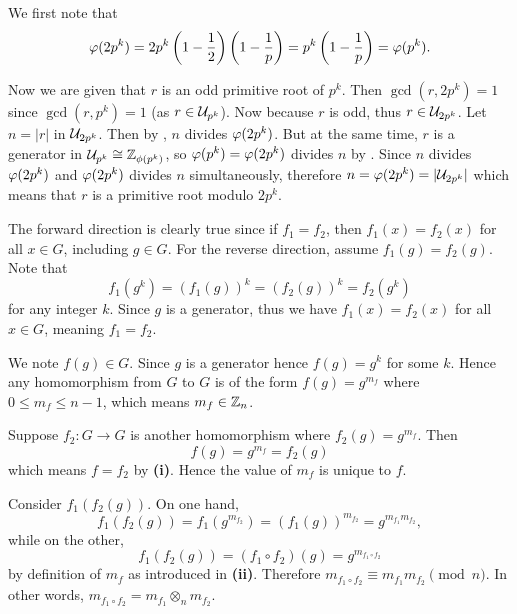 \begin{questions}
    \item We first note that
    \[
        \varphi(2p^k) = 2p^k\left(1-\frac12\right)\left(1-\frac1p\right) = p^k\left(1-\frac1p\right) = \varphi(p^k).
    \]

    Now we are given that $r$ is an odd primitive root of $p^k$. Then $\gcd(r, 2p^k) = 1$ since $\gcd(r, p^k) = 1$ (as $r \in \mathcal{U}_{p^k}$). Now because $r$ is odd, thus $r \in \mathcal{U}_{2p^k}$. Let $n = |r|$ in $\mathcal{U}_{2p^k}$. Then by , $n$ divides $\varphi(2p^k)$. But at the same time, $r$ is a generator in $\mathcal{U}_{p^k} \cong \mathbb{Z}_{\phi(p^k)}$, so $\varphi(p^k) = \varphi(2p^k)$ divides $n$ by . Since $n$ divides $\varphi(2p^k)$ and $\varphi(2p^k)$ divides $n$ simultaneously, therefore $n = \varphi(2p^k) = |\mathcal{U}_{2p^k}|$ which means that $r$ is a primitive root modulo $2p^k$.

    \item \begin{partquestions}{\roman*}
        \item The forward direction is clearly true since if $f_1 = f_2$, then $f_1(x) = f_2(x)$ for all $x \in G$, including $g \in G$. For the reverse direction, assume $f_1(g) = f_2(g)$. Note that
        \[
            f_1(g^k) = (f_1(g))^k = (f_2(g))^k = f_2(g^k)
        \]
        for any integer $k$. Since $g$ is a generator, thus we have $f_1(x) = f_2(x)$ for all $x \in G$, meaning $f_1 = f_2$.

        \item We note $f(g) \in G$. Since $g$ is a generator hence $f(g) = g^k$ for some $k$. Hence any homomorphism from $G$ to $G$ is of the form $f(g) = g^{m_f}$ where $0 \leq m_f \leq n-1$, which means $m_f \in \mathbb{Z}_n$.

        \item Suppose $f_2: G \to G$ is another homomorphism where $f_2(g) = g^{m_f}$. Then
        \[
            f(g) = g^{m_f} = f_2(g)
        \]
        which means $f = f_2$ by \textbf{(i)}. Hence the value of $m_f$ is unique to $f$.

        \item Consider $f_1(f_2(g))$. On one hand,
        \[
            f_1(f_2(g)) = f_1(g^{m_{f_2}}) = (f_1(g))^{m_{f_2}} = g^{m_{f_1}m_{f_2}},
        \]
        while on the other,
        \[
            f_1(f_2(g)) = (f_1 \circ f_2)(g) = g^{m_{f_1\circ f_2}}
        \]
        by definition of $m_f$ as introduced in \textbf{(ii)}. Therefore $m_{f_1\circ f_2} \equiv m_{f_1}m_{f_2} \pmod n$. In other words, $m_{f_1\circ f_2} = m_{f_1} \otimes_n m_{f_2}$.


\end{partquestions}
\end{questions}

